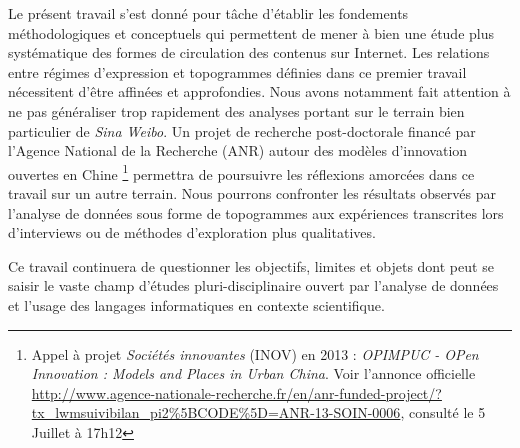 Le présent travail s'est donné pour tâche d'établir les fondements méthodologiques et conceptuels qui permettent de mener à bien une étude plus systématique des formes de circulation des contenus sur Internet. Les relations entre régimes d'expression et topogrammes définies dans ce premier travail nécessitent d'être affinées et approfondies. Nous avons notamment fait attention à ne pas généraliser trop rapidement des analyses portant sur le terrain bien particulier de \textit{Sina Weibo}. Un projet de recherche post-doctorale financé par l'Agence National de la Recherche (ANR) autour des modèles d'innovation ouvertes en Chine
\footnote{
    Appel à projet \textit{Sociétés innovantes} (INOV) en 2013 : \textit{OPIMPUC - OPen Innovation : Models and Places in Urban China}. Voir l'annonce officielle \url{http://www.agence-nationale-recherche.fr/en/anr-funded-project/?tx_lwmsuivibilan_pi2\%5BCODE\%5D=ANR-13-SOIN-0006}, consulté le 5 Juillet à 17h12
} permettra de poursuivre les réflexions amorcées dans ce travail sur un autre terrain. Nous pourrons confronter les résultats observés par l'analyse de données sous forme de topogrammes aux expériences transcrites lors d'interviews ou de méthodes d'exploration plus qualitatives. 

Ce travail continuera de questionner les objectifs, limites et objets dont peut se saisir le vaste champ d'études pluri-disciplinaire ouvert par l'analyse de données et l'usage des langages informatiques en contexte scientifique.
